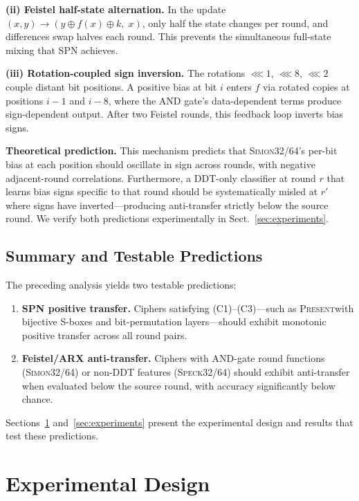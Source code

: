 \documentclass[runningheads]{llncs}
\newcommand{\speck}{\textsc{Speck32/64}}
\newcommand{\simon}{\textsc{Simon32/64}}
\newcommand{\present}{\textsc{Present}}
\begin{document}
\textbf{(ii) Feistel half-state alternation.}
In the update $(x, y) \to (y \oplus f(x) \oplus k, \; x)$, only half the state changes per round, and differences swap halves each round.
This prevents the simultaneous full-state mixing that SPN achieves.

\textbf{(iii) Rotation-coupled sign inversion.}
The rotations $\lll 1$, $\lll 8$, $\lll 2$ couple distant bit positions.
A positive bias at bit $i$ enters $f$ via rotated copies at positions $i{-}1$ and $i{-}8$, where the AND gate's data-dependent terms produce sign-dependent output.
After two Feistel rounds, this feedback loop inverts bias signs.

\textbf{Theoretical prediction.}
This mechanism predicts that \simon's per-bit bias at each position should oscillate in sign across rounds, with negative adjacent-round correlations.
Furthermore, a DDT-only classifier at round $r$ that learns bias signs specific to that round should be systematically misled at $r'$ where signs have inverted---producing anti-transfer strictly below the source round.
We verify both predictions experimentally in Sect.~\ref{sec:experiments}.

\subsection{Summary and Testable Predictions}

The preceding analysis yields two testable predictions:
\begin{enumerate}[itemsep=2pt]
  \item \textbf{SPN positive transfer.} Ciphers satisfying (C1)--(C3)---such as \present with bijective S-boxes and bit-permutation layers---should exhibit monotonic positive transfer across all round pairs.
  \item \textbf{Feistel/ARX anti-transfer.} Ciphers with AND-gate round functions (\simon) or non-DDT features (\speck) should exhibit anti-transfer when evaluated below the source round, with accuracy significantly below chance.
\end{enumerate}
Sections~\ref{sec:method} and~\ref{sec:experiments} present the experimental design and results that test these predictions.


\section{Experimental Design}
\label{sec:method}
\end{document}
